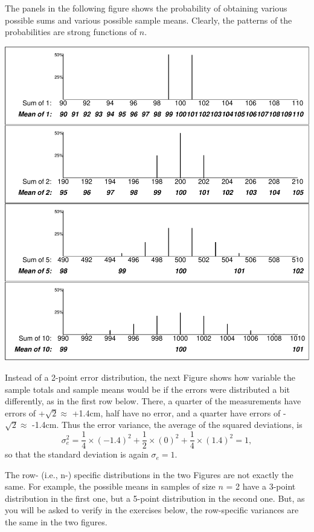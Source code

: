 \documentclass[
]{article}
\begin{document}
The panels in the following figure shows the probability of obtaining
various possible sums and various possible sample means. Clearly, the
patterns of the probabilities are strong functions of \(n.\)

\begin{center}\includegraphics{hanley-computing_files/figure-latex/unnamed-chunk-1-1} \end{center}

Instead of a 2-point error distribution, the next Figure shows how
variable the sample totals and sample means would be if the errors were
distributed a bit differently, as in the first row below. There, a
quarter of the measurements have errors of +\(\sqrt{2} \approx\) +1.4cm,
half have no error, and a quarter have errors of -\(\sqrt{2} \approx\)
-1.4cm. Thus the error variance, the average of the squared deviations,
is
\[\sigma_e^2 = \frac{1}{4} \times (-1.4)^2  +  \frac{1}{2} \times (0)^2 +  \frac{1}{4} \times (1.4)^2 = 1,\]
so that the standard deviation is again \(\sigma_e = 1.\)

The row- (i.e., n-) specific distributions in the two Figures are not
exactly the same. For example, the possible means in samples of size
\(n\) = 2 have a 3-point distribution in the first one, but a 5-point
distribution in the second one. But, as you will be asked to verify in
the exercises below, the row-specific variances are the same in the two
figures.
\end{document}
